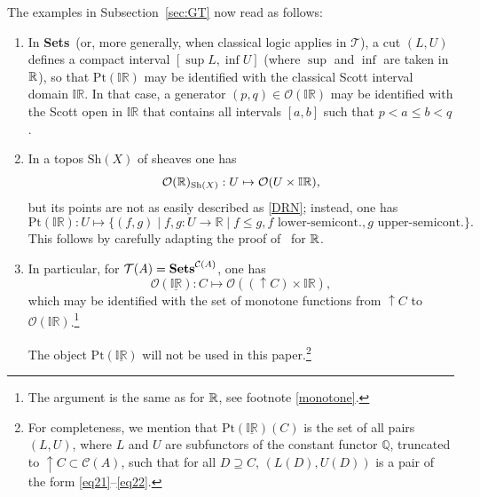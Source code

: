 \documentclass[11pt]{article}
\newcommand{\IR}{\mathbb{IR}}
\newcommand{\beq}{\begin{equation}}
\newcommand{\eeq}{\end{equation}}
\newcommand{\Sets}{\mbox{\textbf{Sets}}}
\newcommand{\x}{\times} \newcommand{\hb}{\hbar}
\newcommand{\er}{\eqref}
\newcommand{\CA}{{\mathcal A}} \newcommand{\CB}{{\mathcal B}}
\newcommand{\CO}{{\mathcal O}} \newcommand{\CP}{{\mathcal P}}
\newcommand{\CT}{{\mathcal T}} \newcommand{\CV}{{\mathcal V}}
\newcommand{\alg}[1]{\ensuremath{#1}}
\newcommand{\Sh}{\ensuremath{\mathrm{Sh}}}
\newcommand{\context}{\ensuremath{\mathcal{C}}}
\newcommand{\asstopos}{\ensuremath{\mathcal{T}}}
\newcommand{\field}[1]{\ensuremath{\mathbb{#1}}}
\renewcommand{\CA}{\mathcal{C}(A)}
\newcommand{\TA}{\mathcal{T}(A)}
\renewcommand{\TA}{\asstopos(\alg{A})}
\renewcommand{\CA}{\context(\alg{A})}
\begin{document}
The examples in Subsection~\ref{sec:GT} now read
as follows:
\begin{enumerate}
  \item  In \Sets\ (or, more generally, when classical logic applies in
    $\CT$), a cut $(L,U)$ defines a compact interval $[\sup L,\inf U]$
    (where $\sup$ and $\inf$ are taken in ${\mathbb R}$), so that
    $\mathrm{Pt}(\IR)$ may be identified with the classical Scott interval domain
    $\IR$. In that case, a generator $(p,q)\in\CO(\IR)$ may be
    identified with the Scott open in $\IR$ that contains all
    intervals $[a,b]$ such that $p<a\leqslant b<q$.

  \item In a topos $\Sh(X)$ of sheaves one has 
  \beq \CO(\R)_{\Sh(X)}: U\mapsto \CO(U\x \IR),\eeq
  but  its points are not as easily described as \er{DRN}; instead, one has
  \beq
  \mathrm{Pt}(\IR): U\mapsto
     \{(f,g) \mid f,g:U \to \field{R} \mid f \leqslant g,
         f \mbox{ lower-semicont.},  
        g \mbox{ upper-semicont.}\}
.\eeq
    This follows by carefully adapting the proof
    of~\cite[Theorem~VI.8.2]{maclanemoerdijk92} for ${\mathbb R}$. 
  \item
    In particular, for  $\TA=\Sets^{\CA}$, one has 
       \beq
    \CO(\underline{\IR}):
    C\mapsto \CO((\uparrow\! C)\x \IR), \label{ddrr}\eeq
   which may be identified with the set of monotone functions from $\uparrow\! C$ to $\CO(\IR)$.\footnote{The argument is the same as for ${\mathbb R}$, see footnote \ref{monotone}.}
     
   The object  $\mathrm{Pt}(\underline{\IR})$ will not be used in this paper.\footnote{For completeness, we mention that $\mathrm{Pt}(\underline{\IR})(C)$ is the set of all pairs $(L,U)$, where $L$ and $U$ are subfunctors of the constant functor $\mathbb{Q}$, truncated to $\uparrow\! C\subset\CA$, such that for all $D\supseteq C$, $(L(D),U(D))$ is a pair 
   of the form \er{eq21}--\er{eq22}.}
 \end{enumerate}
\end{document}
